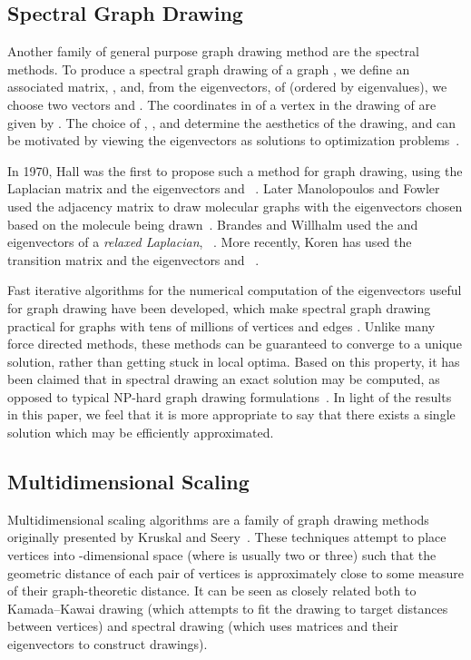 \documentclass[oribibl,10pt]{llncs}
\begin{document}
\begin{appendix}
\subsection{Spectral Graph Drawing}
Another family of general purpose graph drawing method are the spectral methods. 
To produce a spectral graph drawing of a graph , we define an 
associated matrix, , and, from the eigenvectors,
 of  (ordered by eigenvalues), we choose two vectors  and . The coordinates in  of a vertex  in the drawing of  are given by . The choice of , , and  determine the aesthetics of the drawing, and can be motivated by viewing the eigenvectors as solutions to optimization problems~\cite{Kor-CMA-2005}.

In 1970, Hall was the first to propose such a method for graph drawing, using the Laplacian matrix and the eigenvectors  and ~. Later Manolopoulos and Fowler used the adjacency matrix to draw molecular graphs with the eigenvectors chosen based on the molecule being drawn~. Brandes and Willhalm used the  and  eigenvectors of a \emph{relaxed Laplacian}, ~. More recently, Koren has used the transition matrix and the eigenvectors  and ~\cite{Kor-CMA-2005}.

Fast iterative algorithms for the numerical computation of the eigenvectors useful for graph drawing have been developed, which make spectral graph drawing practical for graphs with tens of millions of vertices and edges \cite{Kor-CMA-2005} . Unlike many force directed methods, these methods can be guaranteed to converge to a unique solution, rather than getting stuck in local optima. Based on this property, it has been claimed that in spectral drawing an exact solution may be computed, as opposed to typical NP-hard graph drawing formulations~\cite{Kor-CMA-2005}. In light of the results in this paper, we feel that it is more appropriate to say that there exists a single solution which may be efficiently approximated. 

\subsection{Multidimensional Scaling}

Multidimensional scaling algorithms are a family of graph drawing methods originally presented by Kruskal and Seery~\cite{KruSee-CSG-80}.  These techniques attempt to place vertices into -dimensional space (where  is usually two or three) such that the geometric distance of each pair of vertices is approximately close to some measure of their graph-theoretic distance. 
It can be seen as closely related both to Kamada--Kawai drawing (which attempts to fit the drawing to target distances between vertices) and spectral drawing (which uses matrices and their eigenvectors to construct drawings).


\end{appendix}
\end{document}
